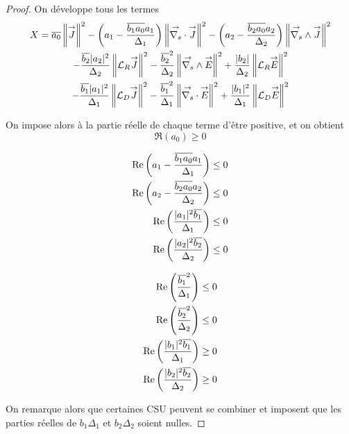 \begin{proof}
    On développe tous les termes
    \begin{multline}
      X = {\overline{a_0}} \left\lVert{\overset{\rightarrow}{J}} \right\rVert^2 - \left(a_1 - \dfrac{{\overline{b_1a_0}}a_1}{\Delta_1}\right) \left\lVert{\overset{\rightarrow}{\nabla_s}} \cdot {\overset{\rightarrow}{J}} \right\rVert^2 - \left(a_2 - \dfrac{{\overline{b_2a_0}}a_2}{\Delta_2}\right) \left\lVert{\overset{\rightarrow}{\nabla_s}} \wedge {\overset{\rightarrow}{J}} \right\rVert^2
      \\
      - \dfrac{{\overline{b_2}}|a_2|^2}{\Delta_2}\left\lVert{\mathcal{L}_R} {\overset{\rightarrow}{J}}\right\rVert^2  -  \dfrac{{\overline{b_2}}^2}{\Delta_2}\left\lVert{\overset{\rightarrow}{\nabla_s}} \wedge{\overset{\rightarrow}{E}}\right\rVert^2 +  \dfrac{|b_2|}{\Delta_2} \left\lVert{\mathcal{L}_R} {\overset{\rightarrow}{E}} \right\rVert^2
      \\
      - \dfrac{{\overline{b_1}}|a_1|^2}{\Delta_1}\left\lVert{\mathcal{L}_D} {\overset{\rightarrow}{J}}\right\rVert^2  - \dfrac{{\overline{b_1}}^2}{\Delta_1}\left\lVert{\overset{\rightarrow}{\nabla_s}} \cdot{\overset{\rightarrow}{E}}\right\rVert^2 + \dfrac{|b_1|^2}{\Delta_1} \left\lVert{\mathcal{L}_D} {\overset{\rightarrow}{E}} \right\rVert^2
    \end{multline}

    On impose alors à la partie réelle de chaque terme d'être positive, et on obtient
    \begin{equation*}
      \Re\left(a_0\right)\ge 0
    \end{equation*}
    \begin{minipage}{0.5\textwidth}
      \begin{align*}
        \operatorname{Re}\left(a_1 - \dfrac{{\overline{b_1a_0}}a_1}{\Delta_1}\right) \le 0 \\
        \operatorname{Re}\left(a_2 - \dfrac{{\overline{b_2a_0}}a_2}{\Delta_2}\right) \le 0 \\
        \operatorname{Re}\left(\dfrac{|a_1|^2{\overline{b_1}}}{\Delta_1}\right) \le 0 \\
        \operatorname{Re}\left(\dfrac{|a_2|^2{\overline{b_2}}}{\Delta_2}\right) \le 0
      \end{align*}
    \end{minipage}
    \begin{minipage}{0.5\textwidth}
      \begin{align*}
        \operatorname{Re}\left(\dfrac{{\overline{b_1}}^2}{\Delta_1}\right) \le 0 \\
        \operatorname{Re}\left(\dfrac{{\overline{b_2}}^2}{\Delta_2}\right) \le 0 \\
        \operatorname{Re}\left(\dfrac{|b_1|^2{\overline{b_1}}}{\Delta_1}\right) \ge 0 \\
        \operatorname{Re}\left(\dfrac{|b_2|^2{\overline{b_2}}}{\Delta_2}\right) \ge 0
      \end{align*}
    \end{minipage}

    On remarque alors que certaines CSU peuvent se combiner et imposent que les parties réelles de \(b_1\Delta_1\) et \(b_2\Delta_2\) soient nulles.
  \end{proof}

